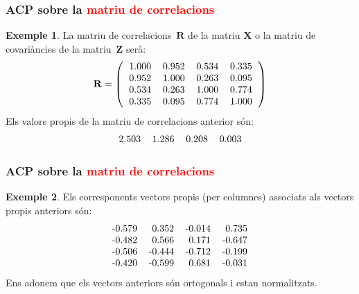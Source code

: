 \documentclass[12pt,t]{beamer}
\newcommand{\red}[1]{\textcolor{red}{#1}}
\theoremstyle{plain}
\theoremstyle{definition}
\newtheorem{exemple}{Exemple}
\begin{document}
\begin{frame}
\frametitle{ACP sobre la \red{matriu de correlacions}}
\begin{exemple}
La matriu de correlacions~$\mathbf{R}$ de la matriu $\mathbf{X}$ o la matriu de covariàncies de la matriu~$\mathbf{Z}$ 
serà:
\[
{\mathbf{R}}=\left(
\begin{tabular}{rrrr}
  1.000 & 0.952 & 0.534 & 0.335 \\ 
  0.952 & 1.000 & 0.263 & 0.095 \\ 
  0.534 & 0.263 & 1.000 & 0.774 \\ 
  0.335 & 0.095 & 0.774 & 1.000 \\ 
  \end{tabular}\right)
\]
Els valors propis de la matriu de correlacions anterior són:
\[
\begin{tabular}{rrrr}
  2.503 & 1.286 & 0.208 & 0.003 \\ 
  \end{tabular}\]

\end{exemple}
\end{frame}


\begin{frame}
\frametitle{ACP sobre la \red{matriu de correlacions}}
\begin{exemple}
Els corresponents vectors propis (per columnes) associats als vectors propis anteriors són:
\[
\begin{tabular}{rrrr}
  -0.579 & 0.352 & -0.014 & 0.735 \\ 
  -0.482 & 0.566 & 0.171 & -0.647 \\ 
  -0.506 & -0.444 & -0.712 & -0.199 \\ 
  -0.420 & -0.599 & 0.681 & -0.031 \\ 
  \end{tabular}\]
Ens adonem que els vectors anteriors són ortogonals i estan normalitzats.


\end{exemple}
\end{frame}
\end{document}
